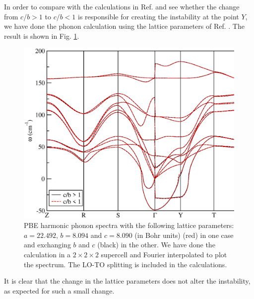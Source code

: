 In order to compare with the calculations in Ref. \cite{dewandre2016two} and see whether the change from $c/b>1$ to 
$c/b<1$ is responsible for creating the instability at the point $Y$, we have done the phonon calculation using the 
lattice parameters of Ref. \cite{dewandre2016two}. The result is shown in Fig. \ref{exchangebc}.
\begin{figure}[th]
\begin{center}
\includegraphics[width=0.8\linewidth]{Figures/exchangebc-harmonic.eps}
\caption[Harmonic phonons of $Cmcm$ SnSe exchanging the $b$ and $c$ lattice parameters.]{PBE harmonic phonon spectra with the following lattice parameters: $a=22.492$, $b=8.094$ and $c=8.090$ (in 
Bohr units) (red) in one case and exchanging $b$ and $c$ (black) in the other. We have done the calculation in a 
$2\times2\times2$ supercell and Fourier interpolated to plot the spectrum. The LO-TO splitting is included in the 
calculations.}
\label{exchangebc}
\end{center}
\end{figure}
It is clear that the change in the lattice parameters does not alter the instability, as expected for such a small 
change.
